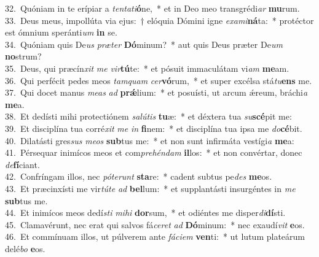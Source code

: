{32.~}Quóniam in te erípiar a \textit{ten}\textit{ta}\textit{ti}\textbf{ó}ne,~* et in Deo meo transgrédi\textit{ar} \textbf{mu}rum.\\
{33.~}Deus meus, impollúta via ejus:~† elóquia Dómini igne \textit{e}\textit{xa}\textit{mi}\textbf{ná}ta:~* protéctor est ómnium speránti\textit{um} \textbf{in} se.\\
{34.~}Quóniam quis De\textit{us} \textit{præ}\textit{ter} \textbf{Dó}minum?~* aut quis Deus præter De\textit{um} \textbf{no}strum?\\
{35.~}Deus, qui præcín\textit{xit} \textit{me} \textit{vir}\textbf{tú}te:~* et pósuit immaculátam vi\textit{am} \textbf{me}am.\\
{36.~}Qui perfécit pedes meos \textit{tam}\textit{quam} \textit{cer}\textbf{vó}rum,~* et super excélsa stá\textit{tu}\textbf{ens} me.\\
{37.~}Qui docet manus \textit{me}\textit{as} \textit{ad} \textbf{prǽ}lium:~* et posuísti, ut arcum ǽreum, bráchi\textit{a} \textbf{me}a.\\
{38.~}Et dedísti mihi protectiónem \textit{sa}\textit{lú}\textit{tis} \textbf{tu}æ:~* et déxtera tua \textit{su}\textbf{scé}pit me:\\
{39.~}Et disciplína tua corré\textit{xit} \textit{me} \textit{in} \textbf{fi}nem:~* et disciplína tua ipsa me \textit{do}\textbf{cé}bit.\\
{40.~}Dilatásti gres\textit{sus} \textit{me}\textit{os} \textbf{sub}tus me:~* et non sunt infirmáta vestígi\textit{a} \textbf{me}a:\\
{41.~}Pérsequar inimícos meos et com\textit{pre}\textit{hén}\textit{dam} \textbf{il}los:~* et non convértar, donec \textit{de}\textbf{fí}ciant.\\
{42.~}Confríngam illos, nec \textit{pó}\textit{te}\textit{runt} \textbf{sta}re:~* cadent subtus pe\textit{des} \textbf{me}os.\\
{43.~}Et præcinxísti me vir\textit{tú}\textit{te} \textit{ad} \textbf{bel}lum:~* et supplantásti insurgéntes in \textit{me} \textbf{sub}tus me.\\
{44.~}Et inimícos meos dedí\textit{sti} \textit{mi}\textit{hi} \textbf{dor}sum,~* et odiéntes me disper\textit{di}\textbf{dí}sti.\\
{45.~}Clamavérunt, nec erat qui salvos fá\textit{ce}\textit{ret} \textit{ad} \textbf{Dó}minum:~* nec exaudí\textit{vit} \textbf{e}os.\\
{46.~}Et commínuam illos, ut púlverem ante \textit{fá}\textit{ci}\textit{em} \textbf{ven}ti:~* ut lutum plateárum delé\textit{bo} \textbf{e}os.\\
